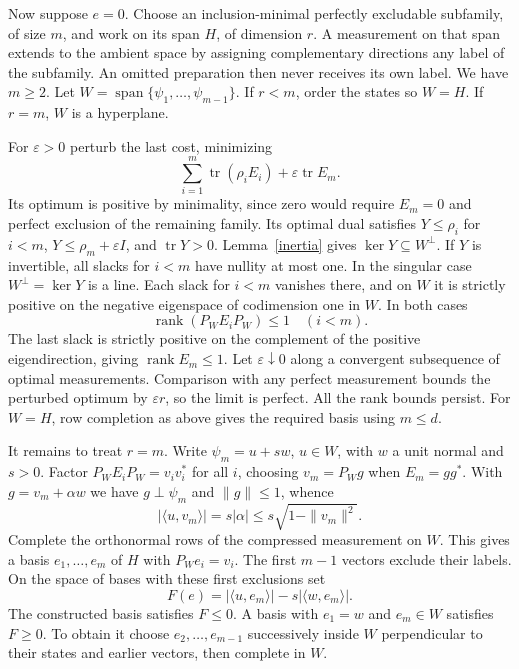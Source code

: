 \documentclass[11pt,a4paper]{article}
\theoremstyle{remark}
\newcommand{\tr}{\operatorname{tr}}
\newcommand{\spn}{\operatorname{span}}
\begin{document}
Now suppose \(e=0\). Choose an inclusion-minimal perfectly excludable subfamily, of size \(m\), and work on its span \(H\), of dimension \(r\). A measurement on that span extends to the ambient space by assigning complementary directions any label of the subfamily. An omitted preparation then never receives its own label. We have \(m\ge2\). Let \(W=\spn\{\psi_1,\ldots,\psi_{m-1}\}\). If \(r<m\), order the states so \(W=H\). If \(r=m\), \(W\) is a hyperplane.

For \(\varepsilon>0\) perturb the last cost, minimizing
\[
             \sum_{i=1}^m\tr(\rho_iE_i)+\varepsilon\tr E_m.
\]
Its optimum is positive by minimality, since zero would require \(E_m=0\) and perfect exclusion of the remaining family. Its optimal dual satisfies \(Y\le\rho_i\) for \(i<m\), \(Y\le\rho_m+\varepsilon I\), and \(\tr Y>0\). Lemma~\ref{inertia} gives \(\ker Y\subseteq W^\perp\). If \(Y\) is invertible, all slacks for \(i<m\) have nullity at most one. In the singular case \(W^\perp=\ker Y\) is a line. Each slack for \(i<m\) vanishes there, and on \(W\) it is strictly positive on the negative eigenspace of codimension one in \(W\). In both cases
\[
       \operatorname{rank}(P_WE_iP_W)\le1\quad(i<m).
\]
The last slack is strictly positive on the complement of the positive eigendirection, giving \(\operatorname{rank}E_m\le1\). Let \(\varepsilon\downarrow0\) along a convergent subsequence of optimal measurements. Comparison with any perfect measurement bounds the perturbed optimum by \(\varepsilon r\), so the limit is perfect. All the rank bounds persist. For \(W=H\), row completion as above gives the required basis using \(m\le d\).

It remains to treat \(r=m\). Write \(\psi_m=u+s w\), \(u\in W\), with \(w\) a unit normal and \(s>0\). Factor \(P_WE_iP_W=v_iv_i^*\) for all \(i\), choosing \(v_m=P_Wg\) when \(E_m=gg^*\). With \(g=v_m+\alpha w\) we have \(g\perp\psi_m\) and \(\|g\|\le1\), whence
\[
       |\langle u,v_m\rangle|=s|\alpha|
                        \le s\sqrt{1-\|v_m\|^2}.
\]
Complete the orthonormal rows of the compressed measurement on \(W\). This gives a basis \(e_1,\ldots,e_m\) of \(H\) with \(P_We_i=v_i\). The first \(m-1\) vectors exclude their labels. On the space of bases with these first exclusions set
\[
         F(e)=|\langle u,e_m\rangle|-s|\langle w,e_m\rangle|.
\]
The constructed basis satisfies \(F\le0\). A basis with \(e_1=w\) and \(e_m\in W\) satisfies \(F\ge0\). To obtain it choose \(e_2,\ldots,e_{m-1}\) successively inside \(W\) perpendicular to their states and earlier vectors, then complete in \(W\).
\end{document}
